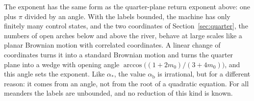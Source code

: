 The exponent has the same form as the quarter-plane return exponent above: one plus $\pi$
divided by an angle. With the labels bounded, the machine has only finitely many control states,
and the two coordinates of Section~\ref{sec:quarter}, the numbers of open arches below and above
the river, behave at large scales like a planar Brownian motion with correlated coordinates. A
linear change of coordinates turns it into a standard Brownian motion and turns the quarter plane
into a wedge with opening angle $\arccos\big((1+2m_0)/(3+4m_0)\big)$, and this angle sets the
exponent. Like $\alpha_*$, the value $\alpha_{\mathrm b}$ is irrational, but for a different
reason: it comes from an angle, not from the root of a quadratic equation. For all meanders the
labels are unbounded, and no reduction of this kind is known.
